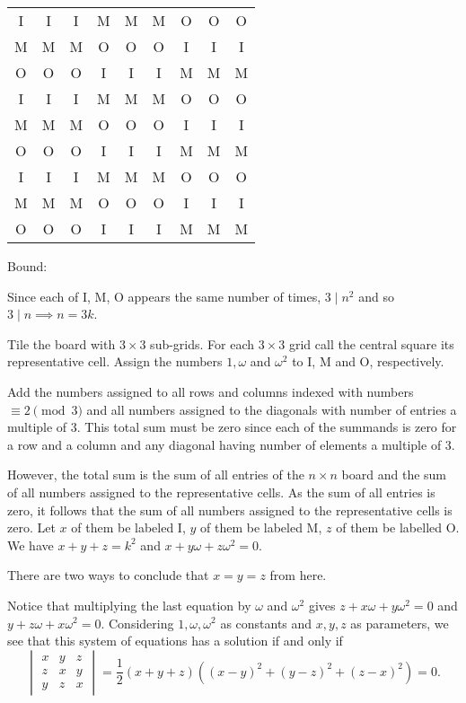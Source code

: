 \renewcommand{\arraystretch}{1.5}
\begin{center}
    \begin{tabular}{|ccc|ccc|ccc|}
        \hline
        I & I & I & M & M & M & O & O & O \\
        M & M & M & O & O & O & I & I & I \\
        O & O & O & I & I & I & M & M & M \\ \hline
        I & I & I & M & M & M & O & O & O \\
        M & M & M & O & O & O & I & I & I \\
        O & O & O & I & I & I & M & M & M \\ \hline
        I & I & I & M & M & M & O & O & O \\
        M & M & M & O & O & O & I & I & I \\
        O & O & O & I & I & I & M & M & M \\
        \hline
    \end{tabular}
\end{center}
\renewcommand{\arraystretch}{1}

Bound:

Since each of I, M, O appears the same number of times, $3\mid n^2$ and so $3\mid n\implies n=3k$.

Tile the board with $3\times 3$ sub-grids. For each $3\times 3$ grid call the central square its representative cell. Assign the numbers $1, \omega$ and $\omega^2$ to I, M and O, respectively.

Add the numbers assigned to all rows and columns indexed with numbers $\equiv 2 \pmod{3}$ and all numbers assigned to the diagonals with number of entries a multiple of 3. This total sum must be zero since each of the summands is zero for a row and a column and any diagonal having number of elements a multiple of 3.

However, the total sum is the sum of all entries of the $n\times n$ board and the sum of all numbers assigned to the representative cells. As the sum of all entries is zero, it follows that the sum of all numbers assigned to the representative cells is zero. Let $x$ of them be labeled I, $y$ of them be labeled M, $z$ of them be labelled O. We have $x+y+z=k^2$ and $x+y\omega+z\omega^2=0$.

There are two ways to conclude that $x=y=z$ from here.

Notice that multiplying the last equation by $\omega$ and $\omega^2$ gives $z+x\omega+y\omega^2=0$ and $y+z\omega+x\omega^2=0$. Considering $1, \omega, \omega^2$ as constants and $x, y, z$ as parameters, we see that this system of equations has a solution if and only if \[\begin{vmatrix}x&y&z\\z&x&y\\y&z&x\end{vmatrix}=\frac{1}{2}(x+y+z)\left((x-y)^2+(y-z)^2+(z-x)^2\right)=0.\]

